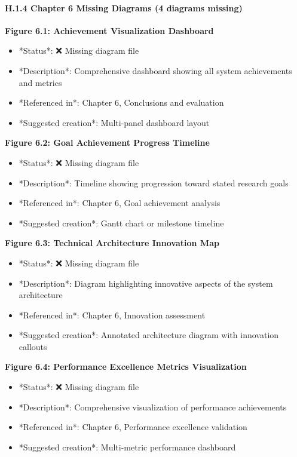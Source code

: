 \documentclass[11pt,a4paper]{article}
\begin{document}
{{\begin{itemize}
\end{itemize}
\paragraph{H.1.4 Chapter 6 Missing Diagrams (4 diagrams missing)}

\textbf{Figure 6.1: Achievement Visualization Dashboard}

\begin{itemize}
\item *Status*: ❌ Missing diagram file
\item *Description*: Comprehensive dashboard showing all system achievements and metrics
\item *Referenced in*: Chapter 6, Conclusions and evaluation
\item *Suggested creation*: Multi-panel dashboard layout

\end{itemize}
\textbf{Figure 6.2: Goal Achievement Progress Timeline}

\begin{itemize}
\item *Status*: ❌ Missing diagram file
\item *Description*: Timeline showing progression toward stated research goals
\item *Referenced in*: Chapter 6, Goal achievement analysis
\item *Suggested creation*: Gantt chart or milestone timeline

\end{itemize}
\textbf{Figure 6.3: Technical Architecture Innovation Map}

\begin{itemize}
\item *Status*: ❌ Missing diagram file
\item *Description*: Diagram highlighting innovative aspects of the system architecture
\item *Referenced in*: Chapter 6, Innovation assessment
\item *Suggested creation*: Annotated architecture diagram with innovation callouts

\end{itemize}
\textbf{Figure 6.4: Performance Excellence Metrics Visualization}

\begin{itemize}
\item *Status*: ❌ Missing diagram file
\item *Description*: Comprehensive visualization of performance achievements
\item *Referenced in*: Chapter 6, Performance excellence validation
\item *Suggested creation*: Multi-metric performance dashboard


\end{itemize}}}
\end{document}
